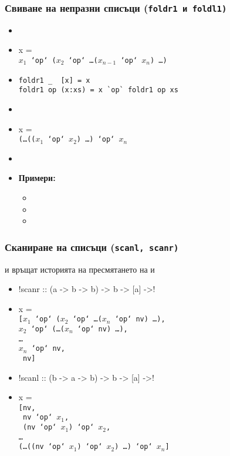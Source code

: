\documentclass[alsotrans]{beamerswitch}
\begin{document}
\begin{frame}[fragile]
  \frametitle{Свиване на непразни списъци (\tt{foldr1} и \tt{foldl1})}

  \begin{itemize}[<+->]
  \item {}
  \item {}\hlist x = \\
    $x_1$\tt{ `op` (}$x_2$\tt{ `op` }\ldots \tt($x_{n-1}$\tt{ `op` }$x_n$\tt) \ldots\tt)
  \item
\begin{lstlisting}
foldr1 _  [x] = x
foldr1 op (x:xs) = x `op` foldr1 op xs
\end{lstlisting}
  \item {}
  \item {}\hlist x = \\
    \tt(\ldots\tt{((}$x_1$\tt{ `op` }$x_2$\tt) \ldots \tt{) `op` }$x_n$
  \item {}
  \item \textbf{Примери:}
    \begin{itemize}
    \item {}
    \item {}
    \item {}
    \end{itemize}
  \end{itemize}
\end{frame}

\begin{frame}
  \frametitle{Сканиране на списъци (\tt{scanl}, \tt{scanr})}

   и  връщат историята на пресмятането на  и 
  \pause\small
  \begin{itemize}[<+->]
  \item \lst!scanr :: (a -> b -> b) -> b -> [a] ->! \tta{[b]}
  \item {} \hlist x = \\
    \tt[$x_1$\tt{ `op` (}$x_2$\tt{ `op` }\ldots \tt($x_n$\tt{ `op` nv)} \ldots\tt{),}\\
    $x_2$\tt{ `op` (}\ldots \tt($x_n$\tt{ `op` nv)} \ldots\tt{),}\\
    \ldots\\
    $x_n$\tt{ `op` nv,}\\
    \tt{ nv]}
  \item \lst!scanl :: (b -> a -> b) -> b -> [a] ->! \tta{[b]}
  \item {} \hlist x = \\
    \tt{[nv,}\\
    \tt{ nv `op` }$x_1$\tt,\\
    \tt{ (nv `op` }$x_1$\tt{) `op` }$x_2$\tt,\\
    \ldots\\
    \tt{(\ldots((nv `op` $x_1$) `op` $x_2$) \ldots ) `op` $x_n$]}
  \end{itemize}
\end{frame}
\end{document}
